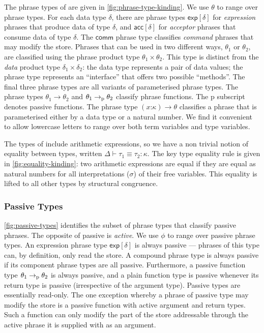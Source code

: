 The phrase types of \DPIA are given in \autoref{fig:phrase-type-kinding}. We use $\theta$ to range over phrase types. For each data type $\delta$, there are phrase types $\mathsf{exp}[\delta]$ for \emph{expression} phrases that produce data of type $\delta$, and $\mathsf{acc}[\delta]$ for \emph{acceptor} phrases that consume data of type $\delta$. The $\mathsf{comm}$ phrase type classifies \emph{command} phrases that may modify the store. Phrases that can be used in two different ways, $\theta_1$ or $\theta_2$, are classified using the phrase product type $\theta_1 \times \theta_2$. This type is distinct from the \emph{data} product type $\delta_1 \times \delta_2$: the data type represents a pair of data values; the phrase type represents an ``interface'' that offers two possible ``methods''.
The final three phrase types are all variants of parameterised phrase types. The phrase types $\theta_1 \to \theta_2$ and $\theta_1 \to_{\textrm{p}} \theta_2$ classify phrase functions. The $\mathrm{p}$ subscript denotes passive functions. The phrase type $(x\mathord:\kappa) \to \theta$ classifies a phrase that is parameterised either by a data type or a natural number. We find it convenient to allow lowercase letters to range over both term variables and type variables.

The types of \DPIA include arithmetic expressions, so we have a non trivial notion of equality between types, written $\Delta \vdash \tau_1 \equiv \tau_2 : \kappa$. The key type equality rule is given in \autoref{fig:equality-kinding}: two arithmetic expressions are equal if they are equal as natural numbers for all interpretations ($\sigma$) of their free variables. This equality is lifted to all other types by structural congruence.

\subsubsection{Passive Types}
\label{sec:passive-types}

\autoref{fig:passive-types} identifies the subset of phrase types that classify passive phrases. The opposite of passive is \emph{active}. We use $\phi$ to range over passive phrase types. An expression phrase type $\mathsf{exp}[\delta]$ is always passive --- phrases of this type can, by definition, only read the store. A compound phrase type is always passive if its component phrase types are all passive. Furthermore, a passive function type $\theta_1 \to_{\textrm{p}} \theta_2$ is always passive, and a plain function type is passive whenever its return type is passive (irrespective of the argument type).
%
Passive types are essentially read-only. The one exception whereby a phrase of passive type may modify the store is a passive function with active argument and return types. Such a function can only modify the part of the store addressable through the active phrase it is supplied with as an argument.

